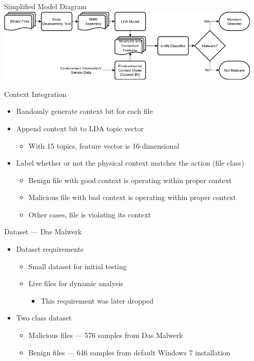 \documentclass[handout,11pt]{beamer}
\begin{document}
	\begin{frame}{Simplified Model Diagram}
		\centering
		\includegraphics[width=0.95\textwidth]{img/system_diagram_simple_context_bit.png}
	\end{frame}
	\begin{frame}{Context Integration}
		\begin{itemize}
			\item Randomly generate context bit for each file
			\item Append context bit to LDA topic vector
				\begin{itemize}
					\item With 15 topics, feature vector is 16-dimensional
				\end{itemize}
			\item Label whether or not the physical context matches the action (file
				class)
				\begin{itemize}
					\item Benign file with good context is operating within proper
						context
					\item Malicious file with bad context is operating within proper
						context
					\item Other cases, file is violating its context
				\end{itemize}
		\end{itemize}
	\end{frame}
	\begin{frame}{Dataset --- Das Malwerk}
		\begin{itemize}
			\item Dataset requirements
				\begin{itemize}
					\item Small dataset for initial testing
					\item Live files for dynamic analysis
						\begin{itemize}
							\item This requirement was later dropped
						\end{itemize}
				\end{itemize}
			\item Two class dataset
				\begin{itemize}
					\item Malicious files --- 576 samples from Das
						Malwerk~\cite{svenssonMalwerk}
					\item Benign files --- 646 samples from default Windows 7
						installation
				\end{itemize}
		\end{itemize}
	\end{frame}
\end{document}
